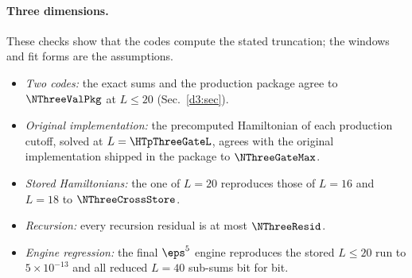 \paragraph{Three dimensions.}\label{d3:checks}
These checks show that the codes compute the stated truncation; the windows and fit forms are the assumptions.
\begin{itemize}
\item \emph{Two codes:} the exact sums and the production package agree to $\NThreeValPkg$ at $L\le20$
 (Sec.~\ref{d3:sec}).
\item \emph{Original implementation:} the precomputed Hamiltonian of each production cutoff, solved at
 $L=\HTpThreeGateL$, agrees with the original implementation shipped in the package to $\NThreeGateMax$.
\item \emph{Stored Hamiltonians:} the one of $L=20$ reproduces those of $L=16$ and $L=18$ to $\NThreeCrossStore$.
\item \emph{Recursion:} every recursion residual is at most $\NThreeResid$.
\item \emph{Engine regression:} the final $\eps^5$ engine reproduces the stored $L\le20$ run to $5\times10^{-13}$ and all
 reduced $L=40$ sub-sums bit for bit.
\end{itemize}
